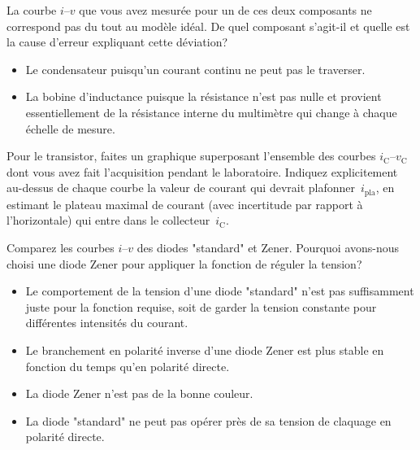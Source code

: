 \documentclass[canadien,12pt,oneside,letterpaper]{article}
\begin{document}
\begin{gradescope}[resume]
    \item La courbe $i$--$v$ que vous avez mesurée pour un de ces deux composants ne correspond pas du tout au modèle idéal. De quel composant s'agit-il et quelle est la cause d'erreur expliquant cette déviation?
    \begin{itemize}[label=$\blacktriangleright$]
            \item Le condensateur puisqu'un courant continu ne peut pas le traverser.
            \item La bobine d'inductance puisque la résistance n'est pas nulle et provient essentiellement de la résistance interne du multimètre qui change à chaque échelle de mesure.
    \end{itemize}
    \item Pour le transistor, faites un graphique superposant l'ensemble des courbes $i_{\mathrm{C}}$--$v_{\mathrm{C}}$ dont vous avez fait l'acquisition pendant le laboratoire. Indiquez explicitement au-dessus de chaque courbe la valeur de courant qui devrait plafonner~$i_{\mathrm{pla}}$, en estimant le plateau maximal de courant (avec incertitude par rapport à l'horizontale) qui entre dans le collecteur~$i_{\mathrm{C}}$. %
    \item Comparez les courbes $i$--$v$ des diodes "standard" et Zener. Pourquoi avons-nous choisi une diode Zener pour appliquer la fonction de réguler la tension?
    \begin{itemize}[label=$\blacktriangleright$]
    \item Le comportement de la tension d'une diode "standard" n'est pas suffisamment juste pour la fonction requise, soit de garder la tension constante pour différentes intensités du courant.
    \item Le branchement en polarité inverse d'une diode Zener est plus stable en fonction du temps qu'en polarité directe.
    \item La diode Zener n'est pas de la bonne couleur.
    \item La diode "standard" ne peut pas opérer près de sa tension de claquage en polarité directe. 
    \end{itemize}

\end{gradescope}
\end{document}
